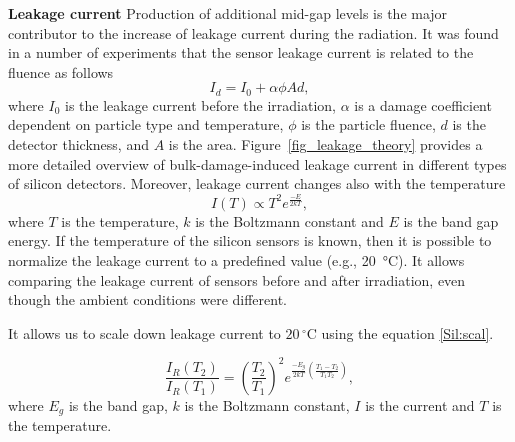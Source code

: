\textbf{Leakage current}\bigbreak
Production of additional mid-gap levels is the major contributor to the increase of leakage current during the radiation. It was found in a number of experiments that the sensor leakage current is related to the fluence as follows
\begin{equation}
\label{eq:fluence}
    I_{d} = I_{0} + \alpha \phi Ad,
\end{equation}
where $I_{0}$ is the leakage current before the irradiation, $\alpha$ is a damage coefficient dependent on particle type and temperature, $\phi$ is the particle fluence, $d$ is the detector thickness, and $A$ is the area. Figure~\ref{fig_leakage_theory} provides a more detailed overview of bulk-damage-induced leakage current in different types of silicon detectors. Moreover, leakage current changes also with the temperature
\begin{equation}
\label{Sil:temp}
    I(T) \propto T^{2}e^{\frac{-E}{2kT}},
\end{equation}
where $T$ is the temperature, $k$ is the Boltzmann constant and $E$ is the band gap energy. 
If the temperature of the silicon sensors is known, then it is possible to normalize the leakage current to a predefined value (e.g., \SI{20}{\celsius}). It allows comparing the leakage current of sensors before and after irradiation, even though the ambient conditions were different. 

It allows us to scale down leakage current to $20\,^{\circ}$C using the equation \ref{Sil:scal}.
 
\begin{equation}
\label{Sil:scal}
    \frac{I_{R}(T_{2})}{I_{R}(T_{1})} = (\frac{T_{2}}{T_{1}})^{2}e^{\frac{-E_{g}}{2kT}(\frac{T_{1}-T_{2}}{T_{1}T_{2}})},
\end{equation}
where $E_{g}$ is the band gap, $k$ is the Boltzmann constant, $I$ is the current and $T$ is the temperature.

